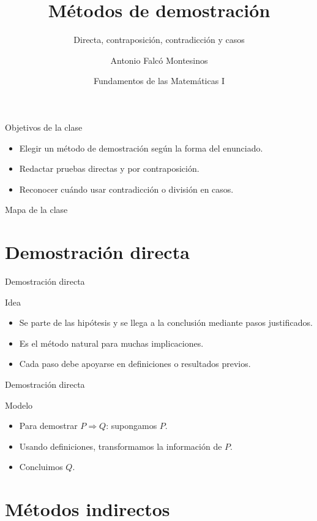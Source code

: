 \documentclass[aspectratio=169,11pt]{beamer}
\title[FdM I -- Clase 05]{Métodos de demostración}
\subtitle{Directa, contraposición, contradicción y casos}
\author{Antonio Falcó Montesinos}
\institute{Universidad CEU Cardenal Herrera}
\date{Fundamentos de las Matemáticas I}
\begin{document}
\begin{frame}
  \titlepage
\end{frame}

\begin{frame}{Objetivos de la clase}
\begin{itemize}
  \item Elegir un método de demostración según la forma del enunciado.
  \item Redactar pruebas directas y por contraposición.
  \item Reconocer cuándo usar contradicción o división en casos.
\end{itemize}
\end{frame}

\begin{frame}{Mapa de la clase}
\tableofcontents
\end{frame}

\section{Demostración directa}

\begin{frame}{Demostración directa}
\begin{block}{Idea}
\begin{itemize}
  \item Se parte de las hipótesis y se llega a la conclusión mediante pasos justificados.
  \item Es el método natural para muchas implicaciones.
  \item Cada paso debe apoyarse en definiciones o resultados previos.
\end{itemize}
\end{block}
\end{frame}

\begin{frame}{Demostración directa}
\begin{block}{Modelo}
\begin{itemize}
  \item Para demostrar \(P\Rightarrow Q\): supongamos \(P\).
  \item Usando definiciones, transformamos la información de \(P\).
  \item Concluimos \(Q\).
\end{itemize}
\end{block}
\end{frame}

\section{Métodos indirectos}
\end{document}
